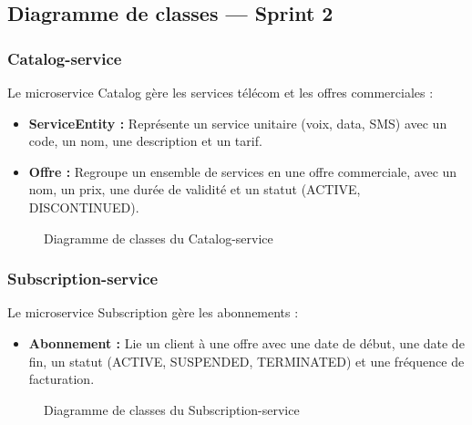 \subsection{Diagramme de classes --- Sprint 2}

\subsubsection{Catalog-service}
Le microservice Catalog gère les services télécom et les offres commerciales :
\begin{itemize}
    \item \textbf{ServiceEntity :} Représente un service unitaire (voix, data, SMS) avec un code, un nom, une description et un tarif.
    \item \textbf{Offre :} Regroupe un ensemble de services en une offre commerciale, avec un nom, un prix, une durée de validité et un statut (ACTIVE, DISCONTINUED).
\end{itemize}

\begin{figure}[H]
    \centering
    \caption{Diagramme de classes du Catalog-service}
    \label{fig:class_catalog}
\end{figure}

\subsubsection{Subscription-service}
Le microservice Subscription gère les abonnements :
\begin{itemize}
    \item \textbf{Abonnement :} Lie un client à une offre avec une date de début, une date de fin, un statut (ACTIVE, SUSPENDED, TERMINATED) et une fréquence de facturation.
\end{itemize}

\begin{figure}[H]
    \centering
    \caption{Diagramme de classes du Subscription-service}
    \label{fig:class_subscription}
\end{figure}

